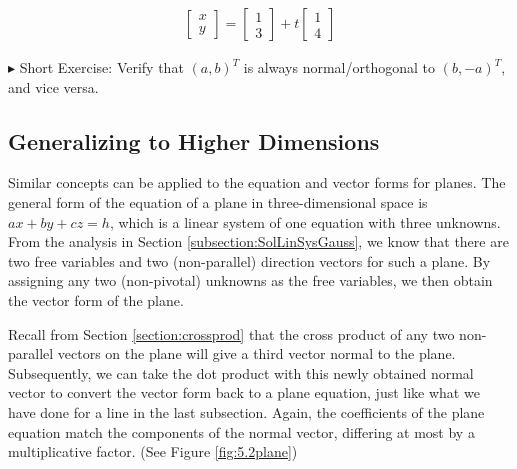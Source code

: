 \begin{align*}
\begin{bmatrix}
x\\
y
\end{bmatrix}
=
\begin{bmatrix}
1\\
3
\end{bmatrix}
+ t
\begin{bmatrix}
1 \\
4
\end{bmatrix} 
\end{align*} \par
$\blacktriangleright$ Short Exercise: Verify that $(a, b)^T$ is always normal/orthogonal to $(b, -a)^T$, and vice versa.\footnotemark

\subsection{Generalizing to Higher Dimensions}
\label{section:vecgeohighdim}
Similar concepts can be applied to the equation and vector forms for planes. The general form of the equation of a plane in three-dimensional space is $ax + by + cz = h$, which is a linear system of one equation with three unknowns. From the analysis in Section \ref{subsection:SolLinSysGauss}, we know that there are two free variables and two (non-parallel) direction vectors for such a plane. By assigning any two (non-pivotal) unknowns as the free variables, we then obtain the vector form of the plane. \par
Recall from Section \ref{section:crossprod} that the cross product of any two non-parallel vectors on the plane will give a third vector normal to the plane. Subsequently, we can take the dot product with this newly obtained normal vector to convert the vector form back to a plane equation, just like what we have done for a line in the last subsection. Again, the coefficients of the plane equation match the components of the normal vector, differing at most by a multiplicative factor. (See Figure \ref{fig:5.2plane})
